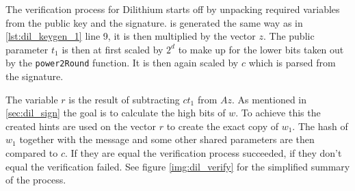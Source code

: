 The verification process for Dilithium starts off by unpacking required variables from the public key and the signature.  is generated the same way as in \ref{lst:dil_keygen_1} line 9, it is then multiplied by the vector $z$. The public parameter $t_1$ is then at first scaled by $2^d$ to make up for the lower bits taken out by the \texttt{power2Round} function. It is then again scaled by $c$ which is parsed from the signature.

The variable $r$ is the result of subtracting $ct_1$ from $Az$. As mentioned in \ref{sec:dil_sign} the goal is to calculate the high bits of $w$. To achieve this the created hints are used on the vector $r$ to create the exact copy of $w_1$. The hash of $w_1$ together with the message and some other shared parameters are then compared to $c$. If they are equal the verification process succeeded, if they don't equal the verification failed. See figure \ref{img:dil_verify} for the simplified summary of the process.
\newpage
{}
